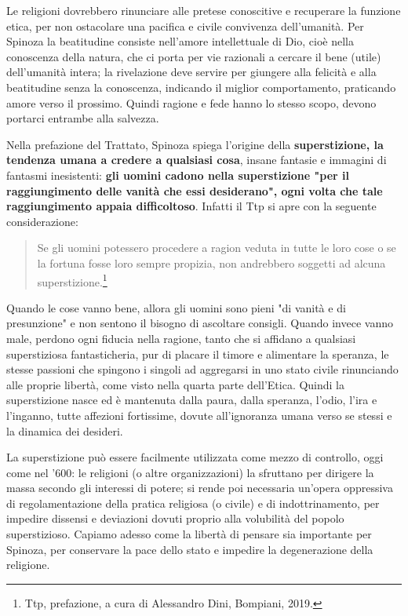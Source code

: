 Le religioni dovrebbero rinunciare alle pretese conoscitive e recuperare la funzione etica, per non ostacolare una pacifica e civile convivenza dell'umanità. Per Spinoza la beatitudine consiste nell'amore intellettuale di Dio, cioè nella conoscenza della natura, che ci porta per vie razionali a cercare il bene (utile) dell'umanità intera; la rivelazione deve servire per giungere alla felicità e alla beatitudine senza la conoscenza, indicando il miglior comportamento, praticando amore verso il prossimo. Quindi ragione e fede hanno lo stesso scopo, devono portarci entrambe alla salvezza.

Nella prefazione del Trattato, Spinoza spiega l'origine della \textbf{superstizione, la tendenza umana a credere a qualsiasi cosa}, insane fantasie e immagini di fantasmi inesistenti: \textbf{gli uomini cadono nella superstizione "per il raggiungimento delle vanità che essi
desiderano"}\textbf{, ogni volta che tale raggiungimento appaia difficoltoso}. Infatti il Ttp si
apre con la seguente considerazione: 

\begin{quotation}
	\small Se gli uomini potessero procedere a ragion veduta in tutte le
	loro cose o se la fortuna fosse loro sempre propizia, non andrebbero soggetti ad alcuna
	superstizione.\footnote{Ttp, prefazione, a cura di Alessandro Dini, Bompiani, 2019.}
\end{quotation}

Quando le cose vanno bene, allora gli uomini sono pieni "di vanità e di
presunzione" e non sentono il bisogno di ascoltare consigli. Quando invece vanno
male, perdono ogni fiducia nella ragione, tanto che si affidano a qualsiasi
superstiziosa fantasticheria, pur di placare il timore e alimentare la speranza, le stesse passioni che spingono i singoli ad aggregarsi in uno stato civile rinunciando alle proprie libertà, come visto nella quarta parte dell'Etica. Quindi la superstizione nasce ed è mantenuta dalla paura, dalla speranza, l'odio, l'ira e l'inganno, tutte affezioni fortissime, dovute all'ignoranza umana verso se stessi e la dinamica dei desideri.

La superstizione può essere facilmente utilizzata come mezzo di controllo, oggi come nel '600: le religioni (o altre organizzazioni) la sfruttano per dirigere la massa secondo gli interessi di potere; si rende poi necessaria un'opera oppressiva di regolamentazione della pratica religiosa (o civile) e di indottrinamento, per impedire dissensi e deviazioni dovuti proprio alla volubilità del popolo superstizioso. Capiamo adesso come la libertà di pensare sia importante per Spinoza, per conservare la pace dello stato e impedire la degenerazione della religione.

